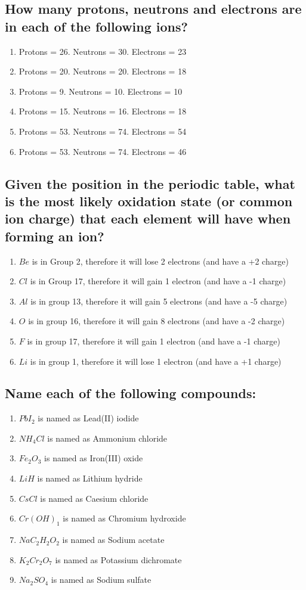 \documentclass[11pt]{article}
\begin{document}
\subsection{How many protons, neutrons and electrons are in each of the following ions?}
\label{sec:org806c6d5}
\begin{enumerate}
\item Protons = 26. Neutrons = 30. Electrons = 23
\item Protons = 20. Neutrons = 20. Electrons = 18
\item Protons = 9. Neutrons = 10. Electrons = 10
\item Protons = 15. Neutrons = 16. Electrons = 18
\item Protons = 53. Neutrons = 74. Electrons = 54
\item Protons = 53. Neutrons = 74. Electrons = 46
\end{enumerate}

\subsection{Given the position in the periodic table, what is the most likely oxidation state (or common ion charge) that each element will have when forming an ion?}
\label{sec:orgc1d8595}
\begin{enumerate}
\item \(Be\) is in Group 2, therefore it will lose 2 electrons (and have a +2 charge)
\item \(Cl\) is in Group 17, therefore it will gain 1 electron (and have a -1 charge)
\item \(Al\) is in group 13, therefore it will gain 5 electrons (and have a -5 charge)
\item \(O\) is in group 16, therefore it will gain 8 electrons (and have a -2 charge)
\item \(F\) is in group 17, therefore it will gain 1 electron (and have a -1 charge)
\item \(Li\) is in group 1, therefore it will lose 1 electron (and have a +1 charge)
\end{enumerate}

\subsection{Name each of the following compounds:}
\label{sec:org576f9fc}
\begin{enumerate}
\item \(PbI_2\) is named as Lead(II) iodide
\item \(NH_4Cl\) is named as Ammonium chloride
\item \(Fe_2O_3\) is named as Iron(III) oxide
\item \(LiH\) is named as Lithium hydride
\item \(CsCl\) is named as Caesium chloride
\item \(Cr(OH)_1\) is named as Chromium hydroxide
\item \(NaC_2H_2O_2\) is named as Sodium acetate
\item \(K_2Cr_2O_7\) is named as Potassium dichromate
\item \(Na_2SO_4\) is named as Sodium sulfate
\end{enumerate}
\end{document}
